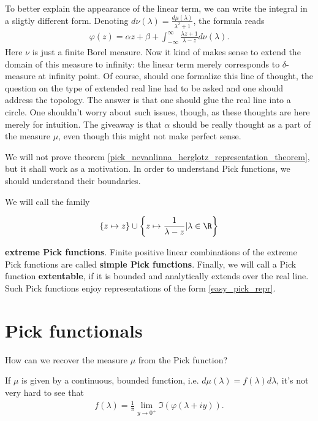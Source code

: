 To better explain the appearance of the linear term, we can write the integral in a sligtly different form. Denoting $d \nu(\lambda) = \frac{d \mu(\lambda)}{\lambda^2 + 1}$, the formula reads
\begin{align*}
	\varphi(z) = \alpha z + \beta + \int_{-\infty}^{\infty} \frac{\lambda z + 1}{\lambda - z} d \nu(\lambda).
\end{align*}
Here $\nu$ is just a finite Borel measure. Now it kind of makes sense to extend the domain of this measure to infinity: the linear term merely corresponds to $\delta$-measure at infinity point. Of course, should one formalize this line of thought, the question on the type of extended real line had to be asked and one should address the topology. The answer is that one should glue the real line into a circle. One shouldn't worry about such issues, though, as these thoughts are here merely for intuition. The giveaway is that $\alpha$ should be really thought as a part of the measure $\mu$, even though this might not make perfect sense.

We will not prove theorem \ref{pick_nevanlinna_herglotz_representation_theorem}, but it shall work as a motivation. In order to understand Pick functions, we should understand their boundaries.

We will call the family

\begin{align*}
	\{z \mapsto z\} \cup \left\{z \mapsto \frac{1}{\lambda - z} | \lambda \in \R\right\}
\end{align*}

\textbf{extreme Pick functions}. Finite positive linear combinations of the extreme Pick functions are called \textbf{simple Pick functions}. Finally, we will call a Pick function \textbf{extentable}, if it is bounded and analytically extends over the real line. Such Pick functions enjoy representations of the form \ref{easy_pick_repr}.
\section{Pick functionals}

\begin{quest}
	How can we recover the measure $\mu$ from the Pick function?
\end{quest}

If $\mu$ is given by a continuous, bounded function, i.e. $d \mu(\lambda) = f(\lambda) d \lambda$, it's not very hard to see that
\begin{align*}
	f(\lambda) = \frac{1}{\pi}\lim_{y \to 0^{+}} \Im(\varphi(\lambda + i y)).
\end{align*}

